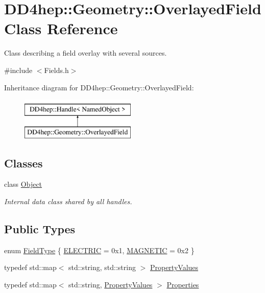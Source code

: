 \hypertarget{class_d_d4hep_1_1_geometry_1_1_overlayed_field}{}\section{D\+D4hep\+:\+:Geometry\+:\+:Overlayed\+Field Class Reference}
\label{class_d_d4hep_1_1_geometry_1_1_overlayed_field}


Class describing a field overlay with several sources.  




{\ttfamily \#include $<$Fields.\+h$>$}

Inheritance diagram for D\+D4hep\+:\+:Geometry\+:\+:Overlayed\+Field\+:\begin{figure}[H]
\begin{center}
\leavevmode
\includegraphics[height=2.000000cm]{class_d_d4hep_1_1_geometry_1_1_overlayed_field}
\end{center}
\end{figure}
\subsection*{Classes}
\begin{DoxyCompactItemize}
\item 
class \hyperlink{class_d_d4hep_1_1_geometry_1_1_overlayed_field_1_1_object}{Object}
\begin{DoxyCompactList}\small\item\em Internal data class shared by all handles. \end{DoxyCompactList}\end{DoxyCompactItemize}
\subsection*{Public Types}
\begin{DoxyCompactItemize}
\item 
enum \hyperlink{class_d_d4hep_1_1_geometry_1_1_overlayed_field_a2f60d9b8d93ccdb0844510b1d3f61b9f}{Field\+Type} \{ \hyperlink{class_d_d4hep_1_1_geometry_1_1_overlayed_field_a2f60d9b8d93ccdb0844510b1d3f61b9fa0f91cdc2eef79d1d0f79b51dee49eab1}{E\+L\+E\+C\+T\+R\+IC} = 0x1, 
\hyperlink{class_d_d4hep_1_1_geometry_1_1_overlayed_field_a2f60d9b8d93ccdb0844510b1d3f61b9fa471f7e06140ef02e7c63027095ba413a}{M\+A\+G\+N\+E\+T\+IC} = 0x2
 \}
\item 
typedef std\+::map$<$ std\+::string, std\+::string $>$ \hyperlink{class_d_d4hep_1_1_geometry_1_1_overlayed_field_ade93bff8af042a76d9d25e1f7072b532}{Property\+Values}
\item 
typedef std\+::map$<$ std\+::string, \hyperlink{class_d_d4hep_1_1_geometry_1_1_overlayed_field_ade93bff8af042a76d9d25e1f7072b532}{Property\+Values} $>$ \hyperlink{class_d_d4hep_1_1_geometry_1_1_overlayed_field_acdf81fbf8e0c336cb724ee2846a2c5b0}{Properties}
\end{DoxyCompactItemize}
